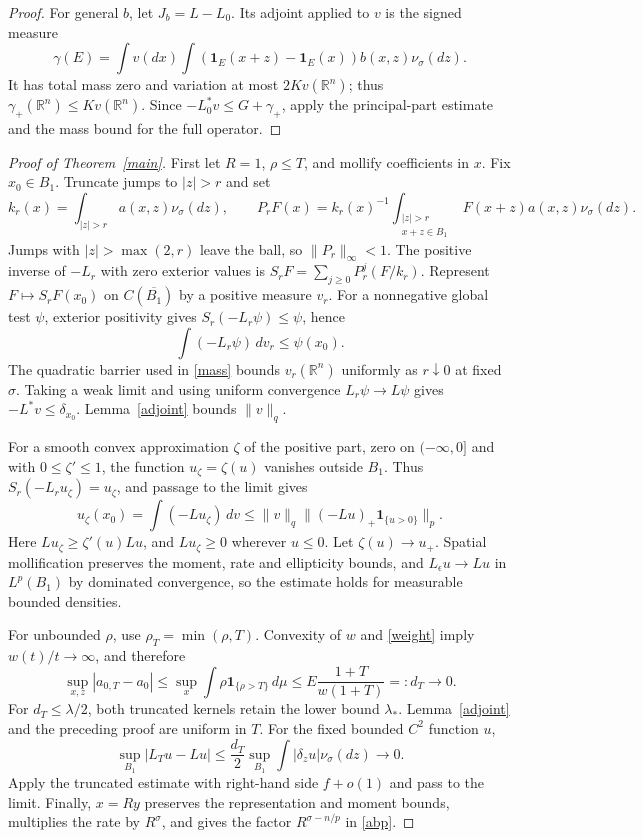 \documentclass{article}
\newcommand{\R}{\mathbb R}
\newcommand{\dd}{\,d}
\newcommand{\one}{\mathbf 1}
\begin{document}
\begin{proof}
For general $b$, let $J_b=L-L_0$. Its adjoint applied to $v$ is the signed measure
\[
 \gamma(E)=\int v(dx)\int
             (\one_E(x+z)-\one_E(x))b(x,z)\nu_\sigma(dz).
\]
It has total mass zero and variation at most $2Kv(\R^n)$; thus $\gamma_+(\R^n)\le Kv(\R^n)$. Since $-L_0^*v\le G+\gamma_+$, apply the principal-part estimate and the mass bound for the full operator.
\end{proof}

\begin{proof}[Proof of Theorem~\ref{main}]
First let $R=1$, $\rho\le T$, and mollify coefficients in $x$. Fix $x_0\in B_1$. Truncate jumps to $|z|>r$ and set
\[
 k_r(x)=\int_{|z|>r}a(x,z)\nu_\sigma(dz),\qquad
 P_rF(x)=k_r(x)^{-1}\int_{\substack{|z|>r\\x+z\in B_1}}
                      F(x+z)a(x,z)\nu_\sigma(dz).
\]
Jumps with $|z|>\max(2,r)$ leave the ball, so $\|P_r\|_\infty<1$. The positive inverse of $-L_r$ with zero exterior values is
$S_rF=\sum_{j\ge0}P_r^j(F/k_r)$. Represent $F\mapsto S_rF(x_0)$ on $C(\overline{B_1})$ by a positive measure $v_r$. For a nonnegative global test $\psi$, exterior positivity gives $S_r(-L_r\psi)\le\psi$, hence
\[
 \int(-L_r\psi)\dd v_r\le\psi(x_0).
\]
The quadratic barrier used in \eqref{mass} bounds $v_r(\R^n)$ uniformly as $r\downarrow0$ at fixed $\sigma$. Taking a weak limit and using uniform convergence $L_r\psi\to L\psi$ gives $-L^*v\le\delta_{x_0}$. Lemma~\ref{adjoint} bounds $\|v\|_q$.

For a smooth convex approximation $\zeta$ of the positive part, zero on $(-\infty,0]$ and with $0\le\zeta'\le1$, the function $u_\zeta=\zeta(u)$ vanishes outside $B_1$. Thus $S_r(-L_ru_\zeta)=u_\zeta$, and passage to the limit gives
\[
 u_\zeta(x_0)=\int(-Lu_\zeta)\dd v
 \le\|v\|_q\|(-Lu)_+\one_{\{u>0\}}\|_p.
\]
Here $Lu_\zeta\ge\zeta'(u)Lu$, and $Lu_\zeta\ge0$ wherever $u\le0$. Let $\zeta(u)\to u_+$. Spatial mollification preserves the moment, rate and ellipticity bounds, and $L_\epsilon u\to Lu$ in $L^p(B_1)$ by dominated convergence, so the estimate holds for measurable bounded densities.

For unbounded $\rho$, use $\rho_T=\min(\rho,T)$. Convexity of $w$ and \eqref{weight} imply $w(t)/t\to\infty$, and therefore
\[
 \sup_{x,z}|a_{0,T}-a_0|
 \le\sup_x\int\rho\one_{\{\rho>T\}}\dd\mu
 \le E\frac{1+T}{w(1+T)}=:d_T\longrightarrow0.
\]
For $d_T\le\lambda/2$, both truncated kernels retain the lower bound $\lambda_*$. Lemma~\ref{adjoint} and the preceding proof are uniform in $T$. For the fixed bounded $C^2$ function $u$,
\[
 \sup_{B_1}|L_Tu-Lu|
 \le\frac{d_T}{2}\sup_{B_1}\int|\delta_z u|\nu_\sigma(dz)\longrightarrow0.
\]
Apply the truncated estimate with right-hand side $f+o(1)$ and pass to the limit. Finally, $x=Ry$ preserves the representation and moment bounds, multiplies the rate by $R^\sigma$, and gives the factor $R^{\sigma-n/p}$ in \eqref{abp}.
\end{proof}
\end{document}
